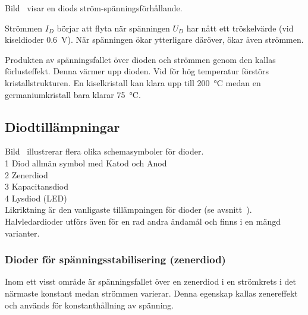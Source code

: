Bild~ visar en diods ström-spänningsförhållande.

Strömmen \(I_D\) börjar att flyta när spänningen \(U_D\) har nått ett
tröskelvärde (vid kiseldioder \qty{0,6}{\volt}).
När spänningen ökar ytterligare däröver, ökar även strömmen.

Produkten av spänningsfallet över dioden och strömmen genom den kallas
förlusteffekt. Denna värmer upp dioden. Vid för hög temperatur förstörs
kristallstrukturen.
En kiselkristall kan klara upp till \qty{200}{\degreeCelsius} medan en
germaniumkristall bara klarar \qty{75}{\degreeCelsius}.\\


\newpage
\subsection{Diodtillämpningar}

Bild~ illustrerar flera olika schemasymboler för dioder.\\
1 Diod allmän symbol med Katod och Anod\\
2 Zenerdiod\\
3 Kapacitansdiod\\
4 Lysdiod (LED)\\

Likriktning är den vanligaste tillämpningen för dioder (se
avsnitt~).
Halvledardioder utförs även för en rad andra ändamål och finns i en mängd
varianter.

\subsubsection{Dioder för spänningsstabilisering (zenerdiod)}
\label{diod_zener}

Inom ett visst område är spänningsfallet över en zenerdiod i en strömkrets i det
närmaste konstant medan strömmen varierar.
Denna egenskap kallas zenereffekt och används för konstanthållning av spänning.

